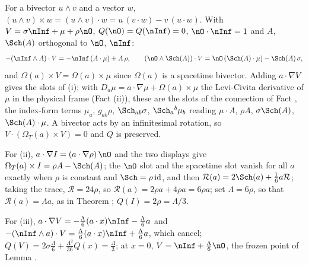 For a bivector $u \wedge v$ and a vector $w$, $(u \wedge v) \times w = (u \wedge v) \cdot w = u\,(v \cdot w) - v\,(u \cdot w)$. With $V = \sigma\nInf + \mu + \rho\nO$, $Q(\nO) = Q(\nInf) = 0$, $\nO \cdot \nInf = 1$ and $A$, $\Sch(A)$ orthogonal to $\nO$, $\nInf$:
\[
-(\nInf \wedge A) \cdot V = -\nInf\,(A \cdot \mu) + A\,\rho, \qquad (\nO \wedge \Sch(A)) \cdot V = \nO\,(\Sch(A) \cdot \mu) - \Sch(A)\,\sigma ,
\]
and $\Omega(a) \times V = \Omega(a) \times \mu$ since $\Omega(a)$ is a spacetime bivector. Adding $a \cdot \nabla V$ gives the slots of (i); with $D_{a}\mu = a \cdot \nabla\mu + \Omega(a) \times \mu$ the Levi-Civita derivative of $\mu$ in the physical frame (Fact (ii)), these are the slots of the connection of Fact , the index-form terms $\mu_{a}$, $g_{ab}\rho$, $\Sch_{ab}\sigma$, $\Sch_{a}{}^{b}\mu_{b}$ reading $\mu \cdot A$, $\rho A$, $\sigma\Sch(A)$, $\Sch(A) \cdot \mu$. A bivector acts by an infinitesimal rotation, so $V \cdot (\Omega_{T}(a) \times V) = 0$ and $Q$ is preserved.

For (ii), $a \cdot \nabla I = (a \cdot \nabla\rho)\,\nO$ and the two displays give $\Omega_{T}(a) \times I = \rho A - \Sch(A)$; the $\nO$ slot and the spacetime slot vanish for all $a$ exactly when $\rho$ is constant and $\Sch = \rho\,\mathrm{id}$, and then $\mathcal{R}(a) = 2\Sch(a) + \tfrac16 a\mathcal{R}$; taking the trace, $\mathcal{R} = 24\rho$, so $\mathcal{R}(a) = 2\rho a + 4\rho a = 6\rho a$; set $\Lambda = 6\rho$, so that $\mathcal{R}(a) = \Lambda a$, as in Theorem ; $Q(I) = 2\rho = \Lambda/3$.

For (iii), $a \cdot \nabla V = -\tfrac{\Lambda}{6}(a \cdot x)\nInf - \tfrac{\Lambda}{6}a$ and $-(\nInf \wedge a) \cdot V = \tfrac{\Lambda}{6}(a \cdot x)\nInf + \tfrac{\Lambda}{6}a$, which cancel; $Q(V) = 2\sigma\tfrac{\Lambda}{6} + \tfrac{\Lambda^{2}}{36}Q(x) = \tfrac{\Lambda}{3}$; at $x = 0$, $V = \nInf + \tfrac{\Lambda}{6}\nO$, the frozen point of Lemma .

